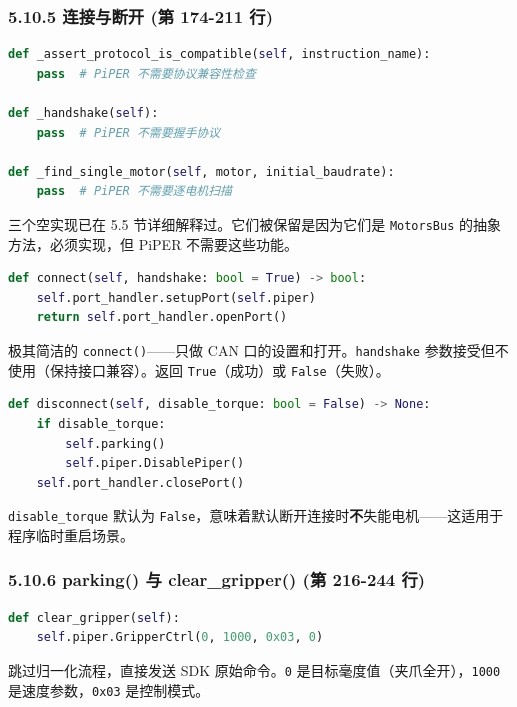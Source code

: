 \documentclass[UTF8,a4paper,11pt]{ctexart}
\begin{document}
{\subsubsection{5.10.5 连接与断开 (第 174-211 行)}

\begin{lstlisting}[language=python]
def _assert_protocol_is_compatible(self, instruction_name):
    pass  # PiPER 不需要协议兼容性检查

def _handshake(self):
    pass  # PiPER 不需要握手协议

def _find_single_motor(self, motor, initial_baudrate):
    pass  # PiPER 不需要逐电机扫描
\end{lstlisting}

三个空实现已在 5.5 节详细解释过。它们被保留是因为它们是 \texttt{MotorsBus} 的抽象方法，必须实现，但 PiPER 不需要这些功能。

\begin{lstlisting}[language=python]
def connect(self, handshake: bool = True) -> bool:
    self.port_handler.setupPort(self.piper)
    return self.port_handler.openPort()
\end{lstlisting}

极其简洁的 \texttt{connect()}——只做 CAN 口的设置和打开。\texttt{handshake} 参数接受但不使用（保持接口兼容）。返回 \texttt{True}（成功）或 \texttt{False}（失败）。

\begin{lstlisting}[language=python]
def disconnect(self, disable_torque: bool = False) -> None:
    if disable_torque:
        self.parking()
        self.piper.DisablePiper()
    self.port_handler.closePort()
\end{lstlisting}

\texttt{disable_torque} 默认为 \texttt{False}，意味着默认断开连接时\textbf{不}失能电机——这适用于程序临时重启场景。

\subsubsection{5.10.6 parking() 与 clear_gripper() (第 216-244 行)}

\begin{lstlisting}[language=python]
def clear_gripper(self):
    self.piper.GripperCtrl(0, 1000, 0x03, 0)
\end{lstlisting}

跳过归一化流程，直接发送 SDK 原始命令。\texttt{0} 是目标毫度值（夹爪全开），\texttt{1000} 是速度参数，\texttt{0x03} 是控制模式。

}
\end{document}

